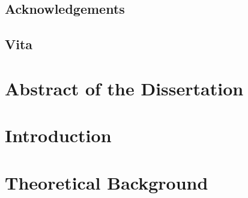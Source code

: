 \documentclass[12pt]{ucsddissertation}
\theoremstyle{definition}
\theoremstyle{definition}
\theoremstyle{definition}
\numberwithin{equation}{section}
\begin{document}
{
\hypersetup{linkcolor=black}
\tableofcontents
\listoffigures
\listoftables
}

\setlength{\parskip}{0.6\baselineskip}


\ifdefined\HCode
    \chapter*{Acknowledgements}
    

    \chapter*{Vita}
    

    \part*{Abstract of the Dissertation}
    

    \mainmatter

    \part*{Introduction}
    
\else
    \begin{acknowledgements}
        
    \end{acknowledgements}

    \begin{vita}
        
    \end{vita}

    \begin{dissertationabstract}
        
    \end{dissertationabstract}

    \mainmatter

    \begin{dissertationintroduction}
        
    \end{dissertationintroduction}
\fi

\part{Theoretical Background}
\label{part:sm}





\end{document}
